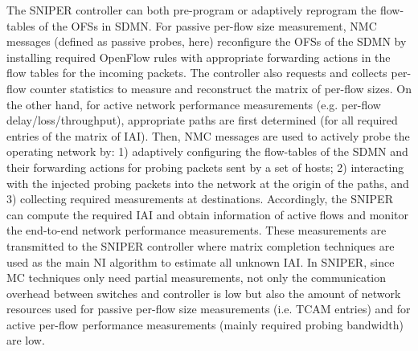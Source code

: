 The SNIPER controller can both pre-program or adaptively reprogram the
flow-tables of the OFSs in SDMN. For passive per-flow size
measurement, NMC messages (defined as passive probes, here)
reconfigure the OFSs of the SDMN by installing required OpenFlow rules
with appropriate forwarding actions in the flow tables for the
incoming packets. The controller also requests and collects per-flow
counter statistics to measure and reconstruct the matrix of per-flow
sizes. On the other hand, for active network performance measurements
(e.g. per-flow delay/loss/throughput), appropriate paths are first
determined (for all required entries of the matrix of IAI). Then, NMC
messages are used to actively probe the operating network by: 1)
adaptively configuring the flow-tables of the SDMN and their
forwarding actions for probing packets sent by a set of hosts; 2)
interacting with the injected probing packets into the network at the
origin of the paths, and 3) collecting required measurements at
destinations. Accordingly, the SNIPER can compute the required IAI and
obtain information of active flows and monitor the end-to-end network
performance measurements. These measurements are transmitted to the
SNIPER controller where matrix completion techniques are used as the
main NI algorithm to estimate all unknown IAI. In SNIPER, since MC
techniques only need partial measurements, not only the communication
overhead between switches and controller is low but also the amount of
network resources used for passive per-flow size measurements
(i.e. TCAM entries) and for active per-flow performance measurements
(mainly required probing bandwidth) are low.


